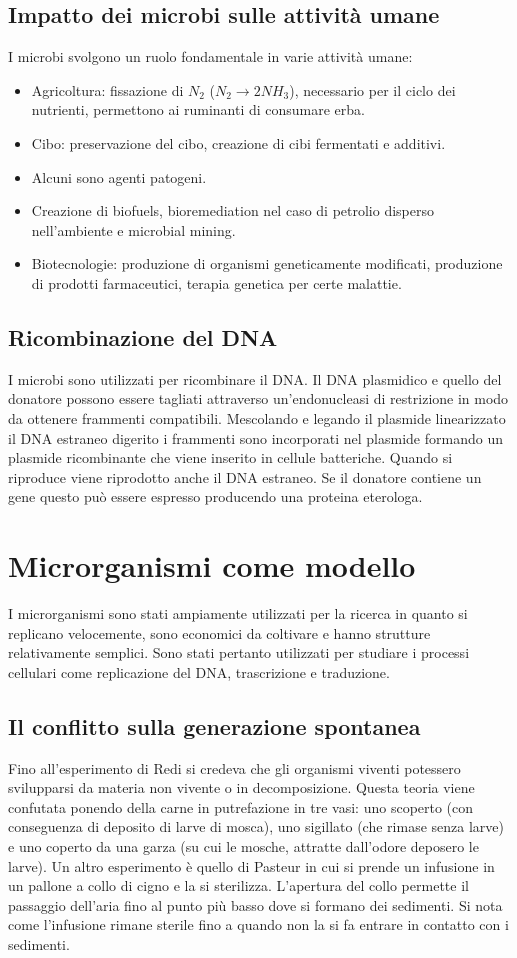 \subsection{Impatto dei microbi sulle attivit\`a umane}
I microbi svolgono un ruolo fondamentale in varie attivit\`a umane:
\begin{itemize}
\item Agricoltura: fissazione di $N_2$ ($N_2\rightarrow 2NH_3$), necessario per il ciclo dei nutrienti, permettono ai ruminanti di consumare erba.
\item Cibo: preservazione del cibo, creazione di cibi fermentati e additivi.
\item Alcuni sono agenti patogeni.
\item Creazione di biofuels, bioremediation nel caso di petrolio disperso nell'ambiente e microbial mining.
\item Biotecnologie: produzione di organismi geneticamente modificati, produzione di prodotti farmaceutici, terapia genetica per certe malattie. 
\end{itemize}
\subsection{Ricombinazione del DNA}
I microbi sono utilizzati per ricombinare il DNA. Il DNA plasmidico e quello del donatore possono essere tagliati attraverso un'endonucleasi di restrizione
in modo da ottenere frammenti compatibili. Mescolando e legando il plasmide linearizzato il DNA estraneo digerito i frammenti sono incorporati nel 
plasmide formando un plasmide ricombinante che viene inserito in cellule batteriche. Quando si riproduce viene riprodotto anche il DNA estraneo. Se il 
donatore contiene un gene questo pu\`o essere espresso producendo una proteina eterologa. 
\section{Microrganismi come modello}
I microrganismi sono stati ampiamente utilizzati per la ricerca in quanto si replicano velocemente, sono economici da coltivare e hanno strutture 
relativamente semplici. Sono stati pertanto utilizzati per studiare i processi cellulari come replicazione del DNA, trascrizione e traduzione. 
\subsection{Il conflitto sulla generazione spontanea}
Fino all'esperimento di Redi si credeva che gli organismi viventi potessero svilupparsi da materia non vivente o in decomposizione. Questa teoria viene
confutata ponendo della carne in putrefazione in tre vasi: uno scoperto (con conseguenza di deposito di larve di mosca), uno sigillato (che rimase senza 
larve) e uno coperto da una garza (su cui le mosche, attratte dall'odore deposero le larve). Un altro esperimento \`e quello di Pasteur in cui si prende un infusione in un pallone a 
collo di cigno e la si sterilizza. L'apertura del collo permette il passaggio dell'aria fino al punto pi\`u basso dove si formano dei sedimenti. Si nota come l'infusione rimane sterile
fino a quando non la si fa entrare in contatto con i sedimenti. 
